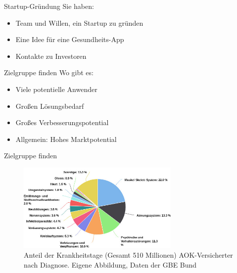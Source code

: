 \begin{frame}{Startup-Gründung}
    Sie haben:
    \begin{itemize}
        \item Team und Willen, ein Startup zu gründen
        \item Eine Idee für eine Gesundheits-App
        \item Kontakte zu Investoren
    \end{itemize}
\end{frame}

\begin{frame}{Zielgruppe finden}
    Wo gibt es:
    \begin{itemize}
        \item Viele potentielle Anwender
        \item Großen Lösungsbedarf
        \item Großes Verbesserungspotential
        \item Allgemein: Hohes Marktpotential
    \end{itemize}
\end{frame}

\begin{frame}{Zielgruppe finden}
    \begin{figure}
        \centering
        \includegraphics[width=0.7\textwidth]{Bilder/Krankheitstage.jpg}
        \caption{Anteil der Krankheitstage (Gesamt 510 Millionen) AOK-Versicherter nach Diagnose. Eigene Abbildung, Daten der GBE Bund \cite{GBEKrankheitstage}}
    \end{figure}
\end{frame}

